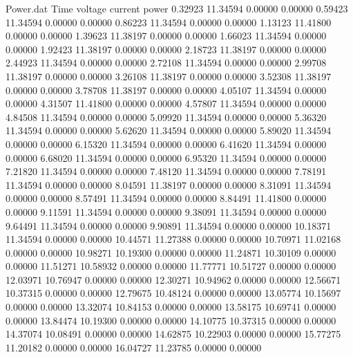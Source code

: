 \begin{filecontents}{Power.dat}
Time voltage current power
   0.32923   11.34594    0.00000    0.00000
   0.59423   11.34594    0.00000    0.00000
   0.86223   11.34594    0.00000    0.00000
   1.13123   11.41800    0.00000    0.00000
   1.39623   11.38197    0.00000    0.00000
   1.66023   11.34594    0.00000    0.00000
   1.92423   11.38197    0.00000    0.00000
   2.18723   11.38197    0.00000    0.00000
   2.44923   11.34594    0.00000    0.00000
   2.72108   11.34594    0.00000    0.00000
   2.99708   11.38197    0.00000    0.00000
   3.26108   11.38197    0.00000    0.00000
   3.52308   11.38197    0.00000    0.00000
   3.78708   11.38197    0.00000    0.00000
   4.05107   11.34594    0.00000    0.00000
   4.31507   11.41800    0.00000    0.00000
   4.57807   11.34594    0.00000    0.00000
   4.84508   11.34594    0.00000    0.00000
   5.09920   11.34594    0.00000    0.00000
   5.36320   11.34594    0.00000    0.00000
   5.62620   11.34594    0.00000    0.00000
   5.89020   11.34594    0.00000    0.00000
   6.15320   11.34594    0.00000    0.00000
   6.41620   11.34594    0.00000    0.00000
   6.68020   11.34594    0.00000    0.00000
   6.95320   11.34594    0.00000    0.00000
   7.21820   11.34594    0.00000    0.00000
   7.48120   11.34594    0.00000    0.00000
   7.78191   11.34594    0.00000    0.00000
   8.04591   11.38197    0.00000    0.00000
   8.31091   11.34594    0.00000    0.00000
   8.57491   11.34594    0.00000    0.00000
   8.84491   11.41800    0.00000    0.00000
   9.11591   11.34594    0.00000    0.00000
   9.38091   11.34594    0.00000    0.00000
   9.64491   11.34594    0.00000    0.00000
   9.90891   11.34594    0.00000    0.00000
  10.18371   11.34594    0.00000    0.00000
  10.44571   11.27388    0.00000    0.00000
  10.70971   11.02168    0.00000    0.00000
  10.98271   10.19300    0.00000    0.00000
  11.24871   10.30109    0.00000    0.00000
  11.51271   10.58932    0.00000    0.00000
  11.77771   10.51727    0.00000    0.00000
  12.03971   10.76947    0.00000    0.00000
  12.30271   10.94962    0.00000    0.00000
  12.56671   10.37315    0.00000    0.00000
  12.79675   10.48124    0.00000    0.00000
  13.05774   10.15697    0.00000    0.00000
  13.32074   10.84153    0.00000    0.00000
  13.58175   10.69741    0.00000    0.00000
  13.84474   10.19300    0.00000    0.00000
  14.10775   10.37315    0.00000    0.00000
  14.37074   10.08491    0.00000    0.00000
  14.62875   10.22903    0.00000    0.00000
  15.77275   11.20182    0.00000    0.00000
  16.04727   11.23785    0.00000    0.00000

\end{filecontents}
